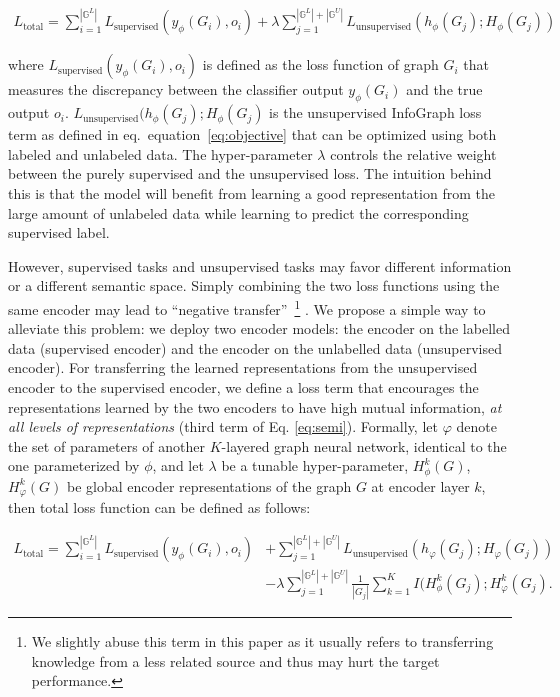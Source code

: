 \documentclass{article} \usepackage{iclr2020_conference,times}
\def\eqref#1{equation~\ref{#1}}
\def\method{InfoGraph}
\begin{document}
\begin{align}
L_{\text{total}} = 
\sum_{i=1}^{|\mathbb{G}^{L}|}  L_{\text{supervised}}(y_{\phi}(G_i), o_i) + \lambda \sum_{j=1}^{|\mathbb{G}^{L}| + |\mathbb{G}^{U}|} L_{\text{unsupervised}}(h_{\phi}(G_j); H_{\phi}(G_j))   
\label{eq:combine-objective}
\end{align}

where ${L_{\text{supervised}}}(y_{\phi}(G_i), o_i)$ is defined as the loss function of graph $G_i$ that measures the discrepancy between the classifier output $y_{\phi}(G_i)$ and the true output $o_{i}$. $L_{\text{unsupervised}}(h_{\phi}(G_j); H_{\phi}(G_j)$ is the unsupervised \method{} loss term as defined in eq.~\eqref{eq:objective} that can be optimized using both labeled and unlabeled data. The hyper-parameter $\lambda$ controls the relative weight between the purely supervised and the unsupervised loss. The intuition behind this is that the model will benefit from learning a good representation from the large amount of unlabeled data while learning to predict the corresponding supervised label.



However, supervised tasks and unsupervised tasks may favor different information or a different semantic space. Simply combining the two loss functions using the same encoder may lead to ``negative transfer''~\footnote{We slightly abuse this term in this paper as it usually refers to transferring knowledge from a less related source and thus may hurt the target performance.} \citep{pan2009survey,rosenstein2005transfer}. We propose a simple way to alleviate this problem: we deploy two encoder models: the encoder on the labelled data (supervised encoder) and the encoder on the unlabelled data (unsupervised encoder). For transferring the learned representations from the unsupervised encoder to the supervised encoder, we define a  loss term that encourages the representations learned by the two encoders to have high mutual information, \textit{at all levels of representations} (third term of Eq. \ref{eq:semi}).  Formally, let $\varphi$ denote the set of parameters of another $K$-layered graph neural network, identical to the one parameterized by $\phi$, and let $\lambda$ be a tunable hyper-parameter, $H_{\phi}^{k}(G)$, $H_{\varphi}^{k}(G)$ be global encoder representations of the graph $G$ at encoder layer $k$,  then total loss function can be defined as follows:

\begin{align}
L_{\text{total}} = 
\sum_{i=1}^{|\mathbb{G}^{L}|}  {L_{\text{supervised}}}(y_{\phi}(G_i), o_i) & + \sum_{j=1}^{|\mathbb{G}^{L}| + |\mathbb{G}^{U}|} {L_{\text{unsupervised}}}(h_{\varphi}(G_j); H_{\varphi}(G_j)) \\
    &- \lambda \sum_{j=1}^{|\mathbb{G}^{L}| + |\mathbb{G}^{U}|} \frac{1}{\left| G_j \right|}\sum_{k=1}^{K}  I(H_{\phi}^{k}(G_j);H_{\varphi}^{k}(G_j).
    \label{eq:semi}
\end{align}
\end{document}
